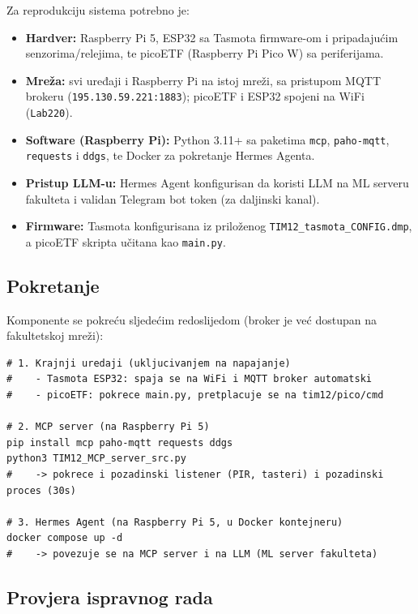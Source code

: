 \documentclass[11pt,a4paper]{article}
\begin{document}
Za reprodukciju sistema potrebno je:
\begin{itemize}[nosep]
      \item \textbf{Hardver:} Raspberry Pi 5, ESP32 sa Tasmota firmware-om i pripadajućim
            senzorima/relejima, te picoETF (Raspberry Pi Pico W) sa periferijama.
      \item \textbf{Mreža:} svi uređaji i Raspberry Pi na istoj mreži, sa pristupom MQTT
            brokeru (\texttt{195.130.59.221:1883}); picoETF i ESP32 spojeni na WiFi
            (\texttt{Lab220}).
      \item \textbf{Software (Raspberry Pi):} Python 3.11+ sa paketima \texttt{mcp},
            \texttt{paho-mqtt}, \texttt{requests} i \texttt{ddgs}, te Docker za pokretanje
            Hermes Agenta.
      \item \textbf{Pristup LLM-u:} Hermes Agent konfigurisan da koristi LLM na ML serveru
            fakulteta i validan Telegram bot token (za daljinski kanal).
      \item \textbf{Firmware:} Tasmota konfigurisana iz priloženog
            \texttt{TIM12\_tasmota\_CONFIG.dmp}, a picoETF skripta učitana kao \texttt{main.py}.
\end{itemize}

\subsection{Pokretanje}

Komponente se pokreću sljedećim redoslijedom (broker je već dostupan na fakultetskoj mreži):

\begin{lstlisting}[style=shell,caption={Pokretanje sistema},captionpos=b]
# 1. Krajnji uredaji (ukljucivanjem na napajanje)
#    - Tasmota ESP32: spaja se na WiFi i MQTT broker automatski
#    - picoETF: pokrece main.py, pretplacuje se na tim12/pico/cmd

# 2. MCP server (na Raspberry Pi 5)
pip install mcp paho-mqtt requests ddgs
python3 TIM12_MCP_server_src.py
#    -> pokrece i pozadinski listener (PIR, tasteri) i pozadinski proces (30s)

# 3. Hermes Agent (na Raspberry Pi 5, u Docker kontejneru)
docker compose up -d
#    -> povezuje se na MCP server i na LLM (ML server fakulteta)
\end{lstlisting}

\subsection{Provjera ispravnog rada}
\end{document}
